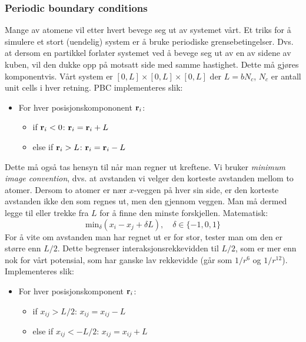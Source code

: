 \documentclass[english, a4paper]{article}
\begin{document}
\subsubsection{Periodic boundary conditions}
Mange av atomene vil etter hvert bevege seg ut av systemet vårt. Et triks for å simulere et stort
(uendelig) system er å bruke periodiske grensebetingelser. Dvs. at dersom en partikkel forlater systemet 
ved å bevege seg ut av en av sidene av kuben, vil den dukke opp på motsatt side med samme hastighet. 
Dette må gjøres komponentvis. Vårt system er $[0,L] \times [0,L] \times [0,L]$
der $L = bN_c$, $N_c$ er antall unit cells i hver retning. PBC implementeres slik:
\begin{itemize}
 \item For hver posisjonskompononent ${\bf r}_i$:
 \begin{itemize}
  \item if ${\bf r}_i < 0$: ${\bf r}_i = {\bf r}_i + L$
  \item else if ${\bf r}_i > L$: ${\bf r}_i = {\bf r}_i - L$
 \end{itemize}
\end{itemize}
Dette må også tas hensyn til når man regner ut kreftene. Vi bruker \textit{minimum image convention}, dvs.
at avstanden vi velger den korteste avstanden mellom to atomer. Dersom to atomer er nær $x$-veggen på hver sin side, 
er den korteste avstanden ikke den som regnes ut, men den gjennom veggen. Man må dermed legge til eller
trekke fra $L$ for å finne den minste forskjellen. Matematisk:
\begin{equation}
 \textrm{min}_\delta(x_i - x_j + \delta L), \quad \delta \in \{-1,0,1\}
\end{equation}
For å vite om avstanden man har regnet ut er for stor, tester man om den er større enn $L/2$. 
Dette begrenser interaksjonsrekkevidden til $L/2$, som er mer enn nok for vårt potensial, som har 
ganske lav rekkevidde (går som $1/r^6$ og $1/r^{12}$). Implementeres slik:
\begin{itemize}
 \item For hver posisjonskomponent ${\bf r}_i$:
 \begin{itemize}
  \item if $x_{ij} > L/2$: $x_{ij} = x_{ij} - L$
  \item else if $x_{ij} < -L/2$: $x_{ij} = x_{ij} + L$
 \end{itemize}
\end{itemize}
\end{document}
